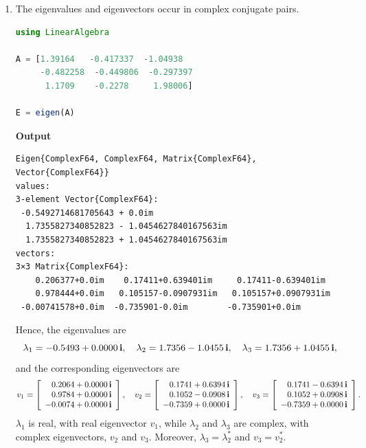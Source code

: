 \begin{enumerate}
\renewcommand{\labelenumi}{(\alph{enumi})}
\setlength{\itemsep}{.6cm}
    \item The eigenvalues and eigenvectors occur in complex conjugate pairs.\\
   
\begin{lstlisting}[language=Julia,style=mystyle]
using LinearAlgebra

A = [1.39164   -0.417337  -1.04938
     -0.482258  -0.449806  -0.297397
      1.1709    -0.2278     1.98006]

E = eigen(A)
\end{lstlisting}
\textbf{Output} 
\begin{verbatim}
Eigen{ComplexF64, ComplexF64, Matrix{ComplexF64}, Vector{ComplexF64}}
values:
3-element Vector{ComplexF64}:
 -0.5492714681705643 + 0.0im
  1.7355827340852823 - 1.0454627840167563im
  1.7355827340852823 + 1.0454627840167563im
vectors:
3×3 Matrix{ComplexF64}:
    0.206377+0.0im    0.17411+0.639401im     0.17411-0.639401im
    0.978444+0.0im   0.105157-0.0907931im   0.105157+0.0907931im
 -0.00741578+0.0im  -0.735901-0.0im        -0.735901+0.0im
\end{verbatim}

Hence, the eigenvalues are 
$$ \lambda_1 = -0.5493+0.0000\mathop{\bm{\mathrm i}} , \quad \lambda_2 = 1.7356-1.0455\mathop{\bm{\mathrm i}}, \quad \lambda_3 = 
1.7356+1.0455\mathop{\bm{\mathrm i}},$$
and the corresponding eigenvectors are 
$$v_1 = \left[
\begin{array}{r}
0.2064+0.0000\mathop{\bm{\mathrm i}}  \\
0.9784+0.0000\mathop{\bm{\mathrm i}}  \\
-0.0074+0.0000\mathop{\bm{\mathrm i}}  \\
\end{array}
\right], \quad v_2 = 
\left[
\begin{array}{r}
0.1741+0.6394\mathop{\bm{\mathrm i}}  \\
0.1052-0.0908\mathop{\bm{\mathrm i}}  \\
-0.7359+0.0000\mathop{\bm{\mathrm i}}  \\
\end{array}
\right], \quad v_3 = 
\left[
\begin{array}{r}
0.1741-0.6394\mathop{\bm{\mathrm i}}  \\
0.1052+0.0908\mathop{\bm{\mathrm i}}  \\
-0.7359+0.0000\mathop{\bm{\mathrm i}}  \\
\end{array}
\right].
$$
$\lambda_1$ is real, with real eigenvector $v_1$, while $\lambda_2$ and $\lambda_3$ are complex, with complex eigenvectors, $v_2$ and $v_3$. Moreover, $\lambda_3 = \lambda_2^\ast$ and $v_3 = v_2^\ast$.  


\end{enumerate}
